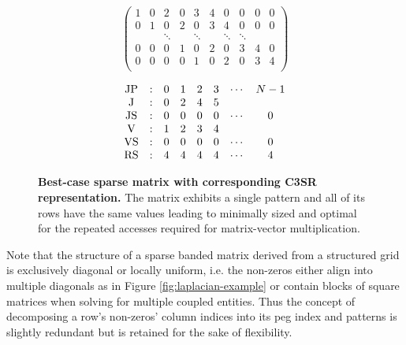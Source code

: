 \documentclass{article}
\begin{document}
    \begin{figure}[ht]
      \centering
      \begin{minipage}{0.5\textwidth}
        \centering
        $$
        \begin{pmatrix}
          1 & 0 & 2 & 0 & 3 & 4 & 0 & 0 & 0 & 0 \\
          0 & 1 & 0 & 2 & 0 & 3 & 4 & 0 & 0 & 0 \\
            &   & \ddots &   & \ddots &   & \ddots & \ddots \\
          0 & 0 & 0 & 1 & 0 & 2 & 0 & 3 & 4 & 0 \\
          0 & 0 & 0 & 0 & 1 & 0 & 2 & 0 & 3 & 4 \\
        \end{pmatrix}
        $$
      \end{minipage}
      \begin{minipage}{0.4\textwidth}
        \centering
        $$
        \begin{matrix}
          \JP & : & 0 & 1 & 2 & 3 & \cdots & N-1 \\
           \J & : & 0 & 2 & 4 & 5 &        &     \\
          \JS & : & 0 & 0 & 0 & 0 & \cdots &  0  \\
           \V & : & 1 & 2 & 3 & 4 &        &     \\
          \VS & : & 0 & 0 & 0 & 0 & \cdots &  0  \\
          \RS & : & 4 & 4 & 4 & 4 & \cdots &  4  \\
        \end{matrix}
        $$
      \end{minipage}
      \caption[Best-case sparse matrix with corresponding C3SR representation.]{\textbf{Best-case sparse matrix with corresponding C3SR representation.} The matrix exhibits a single pattern and all of its rows have the same values leading to minimally sized \J and \V optimal for the repeated accesses required for matrix-vector multiplication.}
      \label{fig:c3sr-example-best-case}
    \end{figure}

    Note that the structure of a sparse banded matrix derived from a structured grid is exclusively diagonal or locally uniform, i.e. the non-zeros either align into multiple diagonals as in Figure \ref{fig:laplacian-example} or contain blocks of square matrices when solving for multiple coupled entities. Thus the concept of decomposing a row's non-zeros' column indices into its peg index and patterns is slightly redundant but is retained for the sake of flexibility.
\end{document}
